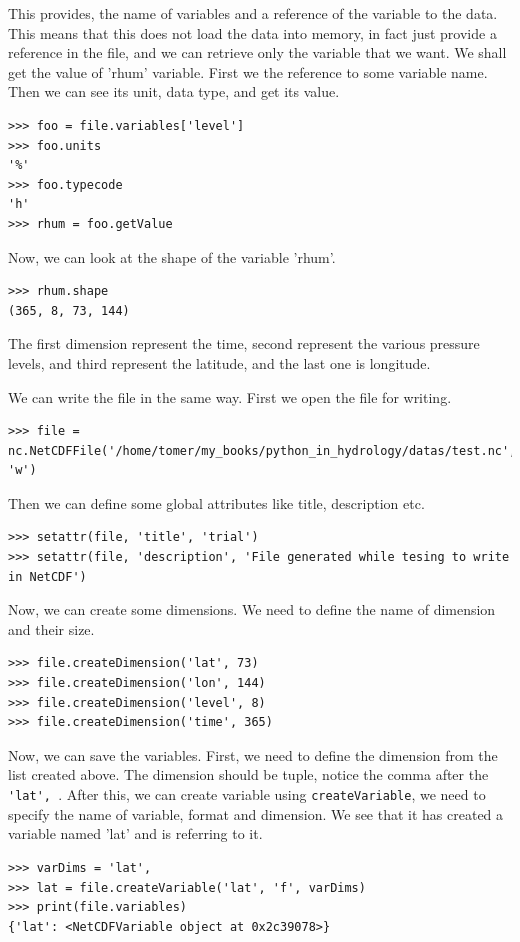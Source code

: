 \documentclass[10pt]{book}
\begin{document}
This provides, the name of variables and a reference of the variable to the data. This means that this does not load the data into memory, in fact just provide a reference in the file, and we can retrieve only the variable that we want. We shall get the value of 'rhum' variable. First we the reference to some variable name. Then we can see its unit, data type, and get its value.
\beforeverb \begin{verbatim}
>>> foo = file.variables['level']
>>> foo.units
'%'
>>> foo.typecode
'h'
>>> rhum = foo.getValue
\end{verbatim} \afterverb

Now, we can look at the shape of the variable 'rhum'.
\beforeverb \begin{verbatim}
>>> rhum.shape
(365, 8, 73, 144)
\end{verbatim} \afterverb
The first dimension represent the time, second represent the various pressure levels, and third represent the latitude, and the last one is longitude. 

We can write the file in the same way. First we open the file for writing. 
\beforeverb \begin{verbatim}
>>> file = nc.NetCDFFile('/home/tomer/my_books/python_in_hydrology/datas/test.nc', 'w')
\end{verbatim} \afterverb

Then we can define some global attributes like title, description etc.
\beforeverb \begin{verbatim}
>>> setattr(file, 'title', 'trial')
>>> setattr(file, 'description', 'File generated while tesing to write in NetCDF')
\end{verbatim} \afterverb

Now, we can create some dimensions. We need to define the name of dimension and their size. 
\beforeverb \begin{verbatim}
>>> file.createDimension('lat', 73) 
>>> file.createDimension('lon', 144) 
>>> file.createDimension('level', 8) 
>>> file.createDimension('time', 365) 
\end{verbatim} \afterverb

Now, we can save the variables. First, we need to define the dimension from the list created above. The dimension should be tuple, notice the comma after the \verb" 'lat', ". After this, we can create variable using \verb"createVariable", we need to specify the name of variable, format and dimension. We see that it has created a variable named 'lat' and is referring to it.
\beforeverb \begin{verbatim}
>>> varDims = 'lat',
>>> lat = file.createVariable('lat', 'f', varDims)
>>> print(file.variables)
{'lat': <NetCDFVariable object at 0x2c39078>}
\end{verbatim} \afterverb
\end{document}
